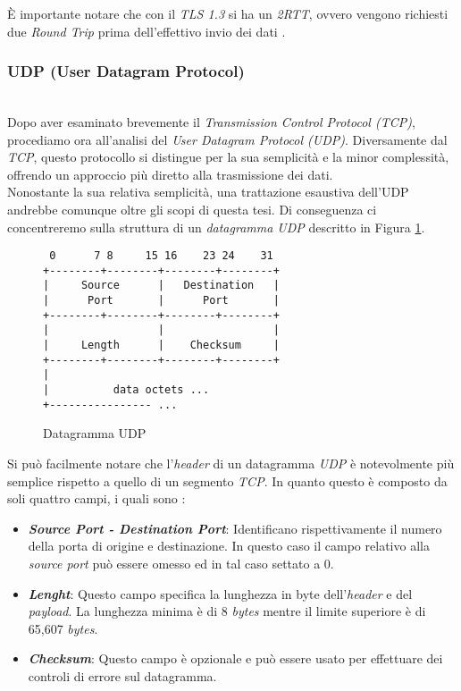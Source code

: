 \noindent È importante notare che con il \emph{TLS 1.3} si ha un \emph{2RTT}, ovvero vengono richiesti due \emph{Round Trip} prima dell'effettivo invio dei dati \cite{site:tls}. 
\subsubsection{UDP (User Datagram Protocol)}
~\\
\indent Dopo aver esaminato brevemente il \emph{Transmission Control Protocol (TCP)},
procediamo ora all'analisi del \emph{User Datagram Protocol (UDP)}. 
Diversamente dal \emph{TCP}, questo protocollo si distingue per la sua semplicità e la minor complessità, offrendo un approccio più diretto alla trasmissione dei dati.
\\
Nonostante la sua relativa semplicità, una trattazione esaustiva dell'UDP andrebbe comunque oltre gli scopi di questa tesi. 
Di conseguenza ci concentreremo sulla struttura di un \emph{datagramma {UDP}} descritto in Figura \ref{udp-datagram}.
\\
\begin{figure}[!h]
    \centering
    \begin{BVerbatim}
 0      7 8     15 16    23 24    31
+--------+--------+--------+--------+
|     Source      |   Destination   |
|      Port       |      Port       |
+--------+--------+--------+--------+
|                 |                 |
|     Length      |    Checksum     |
+--------+--------+--------+--------+
|
|          data octets ...
+---------------- ...
        \end{BVerbatim}
    \caption{Datagramma UDP}
    \label{udp-datagram}
\end{figure}

\noindent Si può facilmente notare che l'\emph{header} di un datagramma \emph{UDP} è notevolmente più semplice rispetto a quello di un segmento \emph{TCP}.
In quanto questo è composto da soli quattro campi, i quali sono :  
\begin{itemize}
    \item \textit{\textbf{Source Port - Destination Port}}: Identificano rispettivamente il numero della porta di origine e destinazione. In questo caso il campo relativo alla \emph{source port} può essere omesso ed in tal caso settato a 0.
    \item \textit{\textbf{Lenght}}: Questo campo specifica la lunghezza in byte dell'\emph{header} e del \emph{payload}. La lunghezza minima è di 8 \emph{bytes} mentre il limite superiore è di 65,607 \emph{bytes}.
    \item \textit{\textbf{Checksum}}: Questo campo è opzionale e può essere usato per effettuare dei controli di errore sul datagramma.
\end{itemize}

